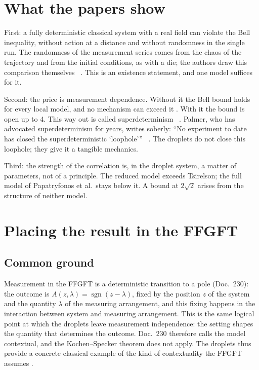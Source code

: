 \section{What the papers show}

First: a fully deterministic classical system with a real field can violate the Bell inequality,
without action at a distance and without randomness in the single run. The randomness of the
measurement series comes from the chaos of the trajectory and from the initial conditions, as with a
die; the authors draw this comparison themselves \QM~\cite{Lopez2026}. This is an existence statement,
and one model suffices for it.

Second: the price is measurement dependence. Without it the Bell bound holds for every local model,
and no mechanism can exceed it \EM. With it the bound is open up to 4. This way out is called
superdeterminism \QM~\cite{HossenfelderPalmer2020}. Palmer, who has advocated superdeterminism for
years, writes soberly: \enquote{No experiment to date has closed the superdeterministic
\enquote{loophole}} \QM~\cite{Palmer2023}. The droplets do not close this loophole; they give it a
tangible mechanics.

Third: the strength of the correlation is, in the droplet system, a matter of parameters, not of a
principle. The reduced model exceeds Tsirelson; the full model of Papatryfonos et al.\ stays below
it. A bound at $2\sqrt2$ arises from the structure of neither model.

\section{Placing the result in the FFGFT}

\subsection{Common ground}

Measurement in the FFGFT is a deterministic transition to a pole (Doc.~230): the outcome is
$A(z,\lambda)=\operatorname{sgn}(z-\lambda)$, fixed by the position $z$ of the system and the
quantity $\lambda$ of the measuring arrangement, and this fixing happens in the interaction between
system and measuring arrangement. This is the same logical point at which the droplets leave
measurement independence: the setting shapes the quantity that determines the outcome. Doc.~230
therefore calls the model contextual, and the Kochen--Specker theorem does not apply. The droplets
thus provide a concrete classical example of the kind of contextuality the FFGFT assumes \SM.


